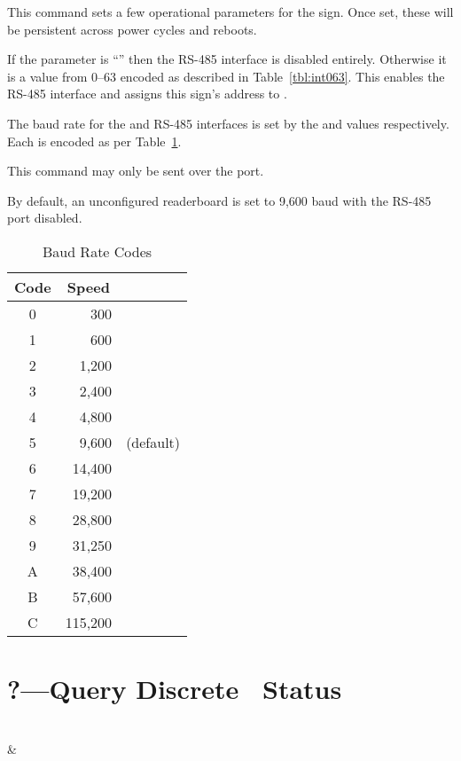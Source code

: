 This command sets a few operational parameters for the sign. Once set, these will be persistent across
power cycles and reboots.

If the  parameter is ``\z{*}'' then the RS-485 interface is disabled entirely. Otherwise it is a
value from 0--63 encoded as described in Table~\ref{tbl:int063}. This enables the RS-485 interface and assigns
this sign's address to .

The baud rate for the  and RS-485 interfaces is set by the  and  values
respectively. Each is encoded as per Table~\ref{tbl:baudcodes}.

This command may only be sent over the  port.

By default, an unconfigured readerboard is set to 9,600 baud with the RS-485 port disabled.
\begin{table}
	\begin{center}
		\begin{tabular}{crl}\toprule
			\bfseries Code & \multicolumn{1}{c}{\bfseries Speed} \\\midrule
			0 & 300\\
			1 & 600\\
			2 & 1,200\\
			3 & 2,400\\
			4 & 4,800\\
			5 & 9,600 & (default)\\
			6 & 14,400\\
			7 & 19,200\\
			8 & 28,800\\
			9 & 31,250\\
			A & 38,400\\
			B & 57,600\\
			C & 115,200\\
		\bottomrule
		\end{tabular}
		\caption{Baud Rate Codes\label{tbl:baudcodes}}
	\end{center}
\end{table}

\section{\z?---Query Discrete \led\ Status}
\begin{center}
\begin{bytefield}[endianness=little,bitwidth=0.11111\textwidth]{2}
	 \\
	 &
\end{bytefield}
\end{center}

